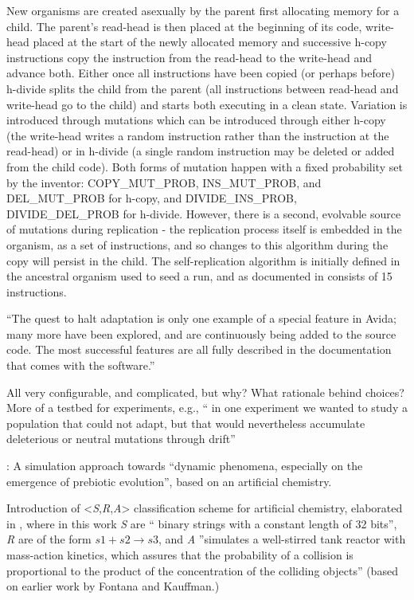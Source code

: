 New organisms are created asexually by the parent first allocating memory for a child. The parent's read-head is then placed at the beginning of its code, write-head placed at the start of the newly allocated memory and successive h-copy instructions copy the instruction from the read-head to the write-head and advance both. Either once all instructions have been copied (or perhaps before) h-divide splits the child from the parent (all instructions between read-head and write-head go to the child) and starts both executing in a clean state. Variation is introduced through mutations which can be introduced through either h-copy (the write-head writes a random instruction rather than the instruction at the read-head) or in h-divide (a single random instruction may be deleted or added from the child code). Both forms of mutation happen with a fixed probability set by the inventor: COPY\_MUT\_PROB, INS\_MUT\_PROB, and DEL\_MUT\_PROB for h-copy, and DIVIDE\_INS\_PROB, DIVIDE\_DEL\_PROB for h-divide. However, there is a second, evolvable source of mutations during replication - the replication process itself is embedded in the organism, as a set of instructions, and so changes to this algorithm during the copy will persist in the child. The self-replication algorithm is initially defined in the ancestral organism used to seed a run, and as documented in \cite[A1.3]{Ofria2004} consists of 15 instructions.

``The quest to halt adaptation is only one example of a special feature in Avida; many more have been explored, and are continuously being added to the source code. The most successful features are all fully described in the documentation that comes with the software.''

All very configurable, and complicated, but why? What rationale behind choices? More of a testbed for experiments, e.g., `` in one experiment we wanted to study a population that could not adapt, but that would nevertheless accumulate deleterious or neutral mutations through drift''

\cite{Dittrich1998}:
A simulation approach towards ``dynamic phenomena, especially on the emergence of prebiotic evolution'', based on an artificial chemistry.

Introduction of \textless{}\emph{S},\emph{R},\emph{A}\textgreater{} classification scheme for artificial chemistry, elaborated in \parencite{Dittrich:2001zr}, where in this work \emph{S} are `` binary strings with a constant length of 32 bits'', \emph{R} are of the form $s1+s2 \rightarrow s3$, and \emph{A} ''simulates a well-stirred tank reactor with mass-action kinetics, which assures that the probability of a collision is proportional to the product of the concentration of the colliding objects'' (based on earlier work by Fontana and Kauffman.)

